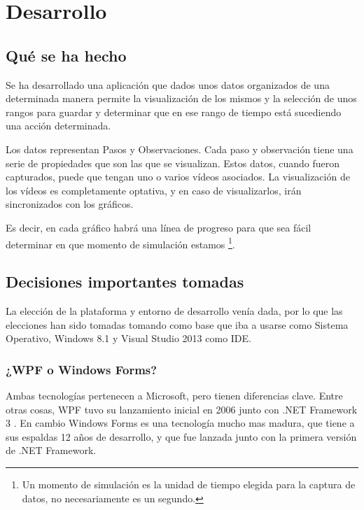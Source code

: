\chapter{Desarrollo}

\section{Qu\'{e} se ha hecho}
Se ha desarrollado una aplicaci\'{o}n que dados unos datos organizados
de una determinada manera permite la visualizaci\'{o}n de los mismos y
la selecci\'{o}n de unos rangos para guardar y determinar que en ese rango de tiempo
est\'{a} sucediendo una acci\'{o}n determinada.

Los datos representan Pasos y Observaciones. Cada paso y observaci\'{o}n tiene una serie
de propiedades que son las que se visualizan. Estos datos, cuando fueron capturados, puede
que tengan uno o varios v\'{i}deos asociados. La visualizaci\'{o}n de los v\'{i}deos es completamente
optativa, y en caso de visualizarlos, ir\'{a}n sincronizados con los gr\'{a}ficos.

Es decir, en cada gr\'{a}fico habr\'{a} una l\'{i}nea de progreso para que sea f\'{a}cil determinar en que momento
de simulaci\'{o}n estamos \footnote{Un momento de simulaci\'{o}n es la unidad de tiempo elegida para la captura de datos, no
    necesariamente es un segundo.}.

\section{Decisiones importantes tomadas}
La elecci\'{o}n de la plataforma y entorno de desarrollo ven\'{i}a dada, por lo que las elecciones han sido tomadas
tomando como base que iba a usarse como Sistema Operativo, Windows 8.1 y Visual Studio 2013 como IDE.

\subsection{¿WPF o Windows Forms?}
Ambas tecnolog\'{i}as pertenecen a Microsoft, pero tienen diferencias clave. Entre otras cosas, WPF tuvo su lanzamiento inicial en 2006
junto con .NET Framework 3 \cite{WPF:Overview}. En cambio Windows Forms es una tecnolog\'{i}a 
mucho mas madura, que tiene a sus espaldas 12 años de desarrollo, y que fue lanzada junto con la primera versi\'{o}n de .NET Framework.

